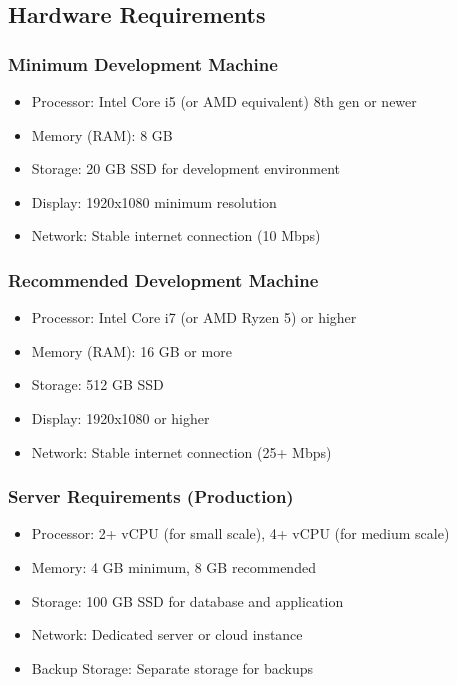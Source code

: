 \subsection{Hardware Requirements}

\subsubsection{Minimum Development Machine}
\begin{itemize}
    \item Processor: Intel Core i5 (or AMD equivalent) 8th gen or newer
    \item Memory (RAM): 8 GB
    \item Storage: 20 GB SSD for development environment
    \item Display: 1920x1080 minimum resolution
    \item Network: Stable internet connection (10 Mbps)
\end{itemize}

\subsubsection{Recommended Development Machine}
\begin{itemize}
    \item Processor: Intel Core i7 (or AMD Ryzen 5) or higher
    \item Memory (RAM): 16 GB or more
    \item Storage: 512 GB SSD
    \item Display: 1920x1080 or higher
    \item Network: Stable internet connection (25+ Mbps)
\end{itemize}

\subsubsection{Server Requirements (Production)}
\begin{itemize}
    \item Processor: 2+ vCPU (for small scale), 4+ vCPU (for medium scale)
    \item Memory: 4 GB minimum, 8 GB recommended
    \item Storage: 100 GB SSD for database and application
    \item Network: Dedicated server or cloud instance
    \item Backup Storage: Separate storage for backups
\end{itemize}

